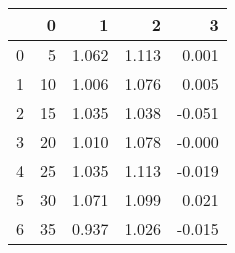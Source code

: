 \begin{tabular}{lrrrr}
\toprule
{} &   0 &      1 &      2 &      3 \\
\midrule
0 &   5 &  1.062 &  1.113 &  0.001 \\
1 &  10 &  1.006 &  1.076 &  0.005 \\
2 &  15 &  1.035 &  1.038 & -0.051 \\
3 &  20 &  1.010 &  1.078 & -0.000 \\
4 &  25 &  1.035 &  1.113 & -0.019 \\
5 &  30 &  1.071 &  1.099 &  0.021 \\
6 &  35 &  0.937 &  1.026 & -0.015 \\
\bottomrule
\end{tabular}

